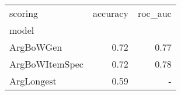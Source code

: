 \begin{tabular}{lrr}
\toprule
scoring &  accuracy & roc\_auc \\
model          &           &         \\
\midrule
ArgBoWGen      &      0.72 &    0.77 \\
ArgBoWItemSpec &      0.72 &    0.78 \\
ArgLongest     &      0.59 &       - \\
\bottomrule
\end{tabular}
